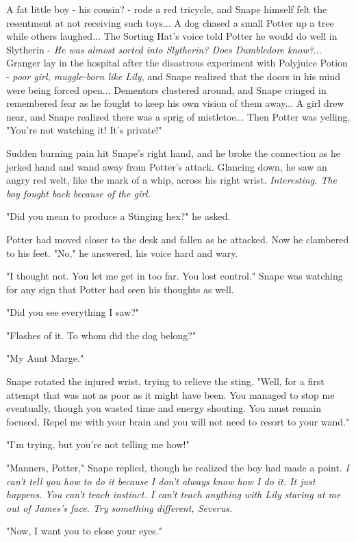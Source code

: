 \documentclass[a4paper,11pt]{article}
\begin{document}
A fat little boy - his cousin? - rode a red tricycle, and Snape himself felt the resentment at not receiving such toys... A dog chased a small Potter up a tree while others laughed... The Sorting Hat's voice told Potter he would do well in Slytherin - \emph{He was almost sorted into Slytherin? Does Dumbledore know?}... Granger lay in the hospital after the disastrous experiment with Polyjuice Potion - \emph{poor girl, muggle-born like Lily}, and Snape realized that the doors in his mind were being forced open... Dementors clustered around, and Snape cringed in remembered fear as he fought to keep his own vision of them away... A girl drew near, and Snape realized there was a sprig of mistletoe... Then Potter was yelling, "You're not watching it! It's private!"

Sudden burning pain hit Snape's right hand, and he broke the connection as he jerked hand and wand away from Potter's attack. Glancing down, he saw an angry red welt, like the mark of a whip, across his right wrist. \emph{Interesting. The boy fought back because of the girl.}

"Did you mean to produce a Stinging hex?" he asked.

Potter had moved closer to the desk and fallen as he attacked. Now he clambered to his feet. "No," he answered, his voice hard and wary.

"I thought not. You let me get in too far. You lost control." Snape was watching for any sign that Potter had seen his thoughts as well.

"Did you see everything I saw?"

"Flashes of it. To whom did the dog belong?"

"My Aunt Marge."

Snape rotated the injured wrist, trying to relieve the sting. "Well, for a first attempt that was not as poor as it might have been. You managed to stop me eventually, though you wasted time and energy shouting. You must remain focused. Repel me with your brain and you will not need to resort to your wand."

"I'm trying, but you're not telling me how!"

"Manners, Potter," Snape replied, though he realized the boy had made a point. \emph{I can't tell you how to do it because I don't always know how I do it. It just happens. You can't teach instinct. I can't teach anything with Lily staring at me out of James's face. Try something different, Severus.}

"Now, I want you to close your eyes."
\end{document}
